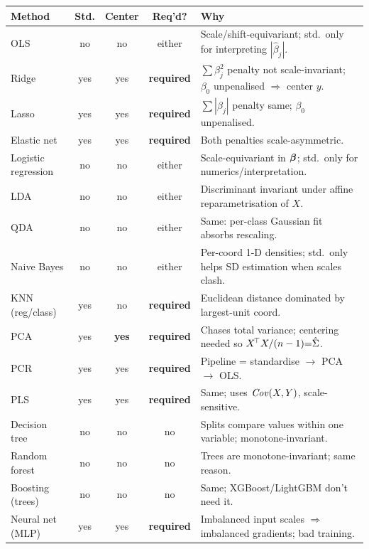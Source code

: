 \scriptsize
\begin{tabularx}{\linewidth}{@{}l c c c X@{}}
\toprule
\textbf{Method} & \textbf{Std.} & \textbf{Center} & \textbf{Req'd?} & \textbf{Why} \\
\midrule
OLS                   & no  & no  & either & Scale/shift-equivariant; std.\ only for interpreting $|\hat\beta_j|$. \\
Ridge                 & yes & yes & \textbf{required} & $\sum\beta_j^2$ penalty not scale-invariant; $\beta_0$ unpenalised $\Rightarrow$ center $y$. \\
Lasso                 & yes & yes & \textbf{required} & $\sum|\beta_j|$ penalty same; $\beta_0$ unpenalised. \\
Elastic net           & yes & yes & \textbf{required} & Both penalties scale-asymmetric. \\
Logistic regression   & no  & no  & either & Scale-equivariant in $\bm{\beta}$; std.\ only for numerics/interpretation. \\
LDA                   & no  & no  & either & Discriminant invariant under affine reparametrisation of $X$. \\
QDA                   & no  & no  & either & Same: per-class Gaussian fit absorbs rescaling. \\
Naive Bayes           & no  & no  & either & Per-coord 1-D densities; std.\ only helps SD estimation when scales clash. \\
KNN (reg/class)       & yes & no  & \textbf{required} & Euclidean distance dominated by largest-unit coord. \\
PCA                   & yes & \textbf{yes} & \textbf{required} & Chases total variance; centering needed so $X^{\!\top} X/(n-1){=}\hat\Sigma$. \\
PCR                   & yes & yes & \textbf{required} & Pipeline = standardise $\to$ PCA $\to$ OLS. \\
PLS                   & yes & yes & \textbf{required} & Same; uses $\mathop{\mathit{Cov}}(X,Y)$, scale-sensitive. \\
Decision tree         & no  & no  & no & Splits compare values within one variable; monotone-invariant. \\
Random forest         & no  & no  & no & Trees are monotone-invariant; same reason. \\
Boosting (trees)      & no  & no  & no & Same; XGBoost/LightGBM don't need it. \\
Neural net (MLP)      & yes & yes & \textbf{required} & Imbalanced input scales $\Rightarrow$ imbalanced gradients; bad training. \\

\end{tabularx}
